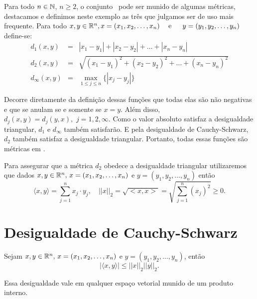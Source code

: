 \documentclass[glenn,refnum,codigo]{Estilo}
\begin{document}
\begin{exemplo}
	Para todo $n \in \mathbb{N}$, $n \geqslant 2$, o conjunto \rn\ pode ser munido de
	algumas métricas, destacamos e definimos neste exemplo as três que
	julgamos ser de uso mais frequente. Para todo $x, y \in \mathbb{R}^{n},
	x=(x_1,x_2, \ldots, x_n)\hspace{1.25em}\hbox{e}\hspace{1.25em}\ y=(y_1,y_2,\ldots,y_n)$ define-se:
	\begin{eqnarray}
	d_1(x,y) &=& |x_1 - y_1| + |x_2 - y_2| + \ldots + |x_n - y_n| \label{d1m}\\
	d_2(x,y) &=& \sqrt{(x_1 - y_1)^2 + (x_2 - y_2)^2 + \ldots + (x_n - y_n)^2}
	\label{d2m}\\
	d_ \infty(x,y) &=& \max_{1 \leqslant j \leqslant n}{\{|x_j - y_j|\}}
	\label{d3m}
	\end{eqnarray}
	
	Decorre diretamente da definição dessas funções que todas elas são não
	negativas e que se anulam se e somente se $x=y$. Além disso,
	$d_j(x,y) = d_j(y,x),\,\, j=1,2,\infty$. Como o valor absoluto satisfaz
	a desigualdade triangular, $d_1$ e $d_\infty$ também satisfarão. E pela
	desigualdade de Cauchy-Schwarz, $d_2$  também satisfaz a desigualdade
	triangular. Portanto, todas essas funções são métricas em \rn.
\end{exemplo}

Para assegurar que a métrica $d_2$ obedece a desigualdade triangular utilizaremos
que dados $x,y\in\mathbb{R}^{n},\, x=(x_1,x_2, \ldots, x_n)$ e $y=(y_1,y_2,\ldots,y_n)$ então
\begin{equation}\label{defnor}
\langle x,y \rangle = \sum_{j=1}^{n}x_j \cdot y_j,\quad
||x||_2 = \sqrt{<x,x>}=\sqrt{\sum_{j=1}^{n}(x_j)^2}\geqslant 0.
\end{equation}


\section{Desigualdade de Cauchy-Schwarz}

\begin{teorema}\label{cs}
	Sejam $x,y\in\mathbb{R}^{n},\, x=(x_1,x_2, \ldots, x_n)$ e $y=(y_1,y_2,\ldots,y_n)$, então
	\[
	|\langle x,y \rangle |\leqslant ||x||_2||y||_2.
	\]
\end{teorema}

Essa desigualdade vale em qualquer espaço vetorial munido de um produto interno.
\end{document}
